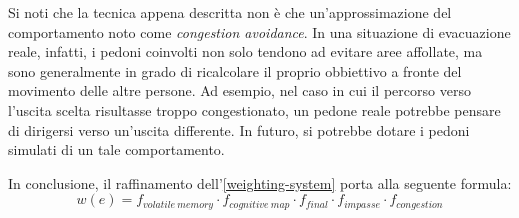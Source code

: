 \documentclass[12pt,a4paper,openright,oneside]{book}
\begin{document}
\begin{itemize}
 Si noti che la tecnica appena descritta non è che un'approssimazione del comportamento noto come \emph{congestion avoidance}. In una situazione di evacuazione reale, infatti, i pedoni coinvolti non solo tendono ad evitare aree  affollate, ma sono generalmente in grado di ricalcolare il proprio obbiettivo a fronte del movimento delle altre persone. Ad esempio, nel caso in cui il percorso verso l'uscita scelta risultasse troppo congestionato, un pedone reale potrebbe pensare di dirigersi verso un'uscita differente. In futuro, si potrebbe dotare i pedoni simulati di un tale comportamento.
\end{itemize}

In conclusione, il raffinamento dell'\cref{weighting-system} porta alla seguente formula:
\begin{equation}\label{weighting-system-refined}
w(e) = f_{volatile\ memory}\cdot f_{cognitive\ map}\cdot f_{final}\cdot f_{impasse}\cdot f_{congestion}
\end{equation}
\end{document}
